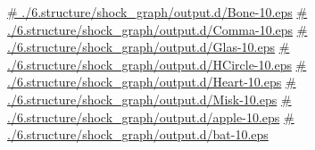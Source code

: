 \documentclass{book}
\begin{document}
\hyperref[==./6.structure/shock_graph/output.d/Bone-10.eps]{\# ./6.structure/shock\_graph/output.d/Bone-10.eps}
\hyperref[==./6.structure/shock_graph/output.d/Comma-10.eps]{\# ./6.structure/shock\_graph/output.d/Comma-10.eps}
\hyperref[==./6.structure/shock_graph/output.d/Glas-10.eps]{\# ./6.structure/shock\_graph/output.d/Glas-10.eps}
\hyperref[==./6.structure/shock_graph/output.d/HCircle-10.eps]{\# ./6.structure/shock\_graph/output.d/HCircle-10.eps}
\hyperref[==./6.structure/shock_graph/output.d/Heart-10.eps]{\# ./6.structure/shock\_graph/output.d/Heart-10.eps}
\hyperref[==./6.structure/shock_graph/output.d/Misk-10.eps]{\# ./6.structure/shock\_graph/output.d/Misk-10.eps}
\hyperref[==./6.structure/shock_graph/output.d/apple-10.eps]{\# ./6.structure/shock\_graph/output.d/apple-10.eps}
\hyperref[==./6.structure/shock_graph/output.d/bat-10.eps]{\# ./6.structure/shock\_graph/output.d/bat-10.eps}
\end{document}
